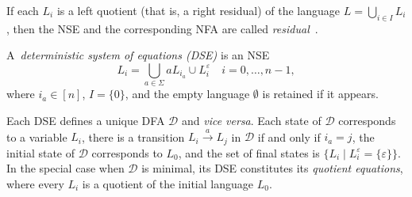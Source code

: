 \documentclass[preprint,12pt]{elsarticle}
\newcommand{\eps}{\varepsilon}
\newcommand{\emp}{\emptyset}
\newcommand{\Sig}{\Sigma}
\newcommand{\cD}{{\mathcal D}}
\begin{document}
If each $L_i$ is a left quotient (that is, a right residual) of the language 
$L=\bigcup_{i\in I} L_i$, then the NSE and the corresponding NFA are called 
\emph{residual}~\cite{DLT02}.

A~\emph{deterministic system of equations (DSE)} 
is an NSE
\begin{equation}
L_i = \bigcup_{a\in \Sig} aL_{i_a} \cup L_i^\eps \quad i=0,\ldots,n-1,
\end{equation}
where ${i_a}\in [n]$, $I=\{0\}$, and 
the empty language $\emp$ is retained if it appears. 

Each DSE defines a unique DFA $\cD$ and \emph{vice versa}. Each state of $\cD$ 
corresponds to a variable $L_i$, there is a transition  
$L_i \stackrel{a}{\rightarrow} L_j$ in $\cD$ if and only if 
$i_a=j$,
the initial state of $\cD$ corresponds to $L_0$, and the set of final states is 
$\{L_i \mid L_i^\eps=\{\eps\}\}$.
In the special case when $\cD$ is minimal, its DSE constitutes its 
\emph{quotient equations}, where every $L_i$ is a quotient of the initial 
language $L_0$.
\end{document}

